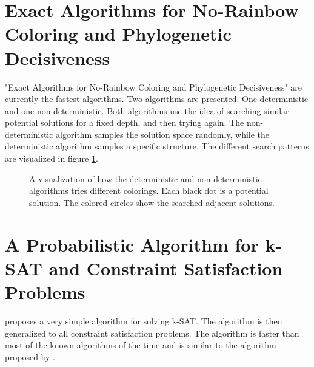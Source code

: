 \documentclass[msc,lith,english]{liuthesis}
\begin{document}
\section{Exact Algorithms for No-Rainbow Coloring and Phylogenetic Decisiveness}
"Exact Algorithms for No-Rainbow Coloring and Phylogenetic Decisiveness" \cite{sourceNoRainbow}
are currently the fastest algorithms.
Two algorithms are presented. One deterministic and one non-deterministic. Both
algorithms use the idea of searching similar potential solutions for a fixed
depth, and then trying again. The non-deterministic algorithm samples the
solution space randomly, while the deterministic algorithm samples a specific
structure. The different search patterns are visualized in figure \ref{figNoRainbowSearchPattern}. 

\begin{center}
\begin{figure}[h]
\centering
{}
  \caption{A visualization of how the deterministic and non-deterministic algorithms tries different colorings. Each black dot is a potential solution. The colored circles show the searched adjacent solutions.}
  \label{figNoRainbowSearchPattern}
\end{figure}
\end{center}

\section{A Probabilistic Algorithm for k-SAT and Constraint Satisfaction Problems}
\citeauthor{sourceProbAlgo} proposes a very simple algorithm for solving k-SAT.
The algorithm is then generalized to all constraint satisfaction problems. The
algorithm is faster than most of the known algorithms of the time and is
similar to the algorithm proposed by \citeauthor{sourceNoRainbow} \cite{sourceNoRainbow}.
\end{document}
